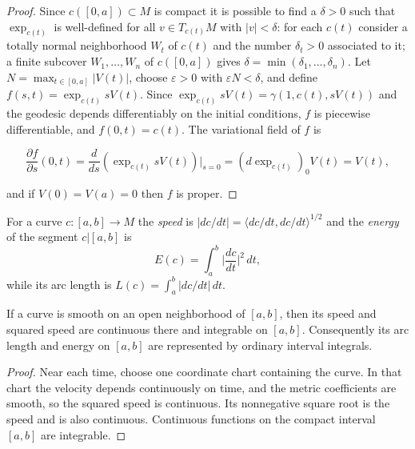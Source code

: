 \begin{proof}
  \sketch
  Since $c([0,a])\subset M$ is compact it is possible to find a $\delta>0$
  such that $\exp_{c(t)}$ is well-defined for all $v\in T_{c(t)}M$ with $|v|<\delta$:
  for each $c(t)$ consider a totally normal neighborhood $W_t$ of $c(t)$ and the
  number $\delta_t>0$ associated to it; a finite subcover
  $W_1,\dots,W_n$ of $c([0,a])$ gives $\delta=\min(\delta_1,\dots,\delta_n)$.
  Let $N=\max_{t\in[0,a]}|V(t)|$, choose $\varepsilon>0$ with
  $\varepsilon N<\delta$, and define
  $f(s,t)=\exp_{c(t)}sV(t)$. Since $\exp_{c(t)}sV(t)=\gamma(1,c(t),sV(t))$ and the
  geodesic depends differentiably on the initial conditions, $f$ is piecewise
  differentiable, and $f(0,t)=c(t)$. The variational field of $f$ is

  $$
  \frac{\partial f}{\partial s}(0,t)=\frac{d}{ds}(\exp_{c(t)}sV(t))\Big|_{s=0}=(d\exp_{c(t)})_0 V(t)=V(t),
  $$

  and if $V(0)=V(a)=0$ then $f$ is proper.
\end{proof}
\begin{definition}
  \label{def:dc-ch9-2-2-energy}
  \leanok
  For a curve $c:[a,b]\to M$ the \emph{speed} is $|dc/dt|=\langle dc/dt,dc/dt\rangle^{1/2}$
  and the \emph{energy} of the segment $c|[a,b]$ is
  $$
  E(c)=\int_a^b\Big|\frac{dc}{dt}\Big|^2\,dt,
  $$
  while its arc length is $L(c)=\int_a^b|dc/dt|\,dt$.
\end{definition}
\begin{lemma}
  \label{lem:dc-ch9-2-2-smooth-speed-integrable}
  \leanok
  If a curve is smooth on an open neighborhood of $[a,b]$, then its speed and
  squared speed are continuous there and integrable on $[a,b]$. Consequently
  its arc length and energy on $[a,b]$ are represented by ordinary interval
  integrals.
\end{lemma}
\begin{proof}
  \leanok
  \sketch
  Near each time, choose one coordinate chart containing the curve. In that
  chart the velocity depends continuously on time, and the metric coefficients
  are smooth, so the squared speed is continuous. Its nonnegative square root
  is the speed and is also continuous. Continuous functions on the compact
  interval $[a,b]$ are integrable.
\end{proof}
